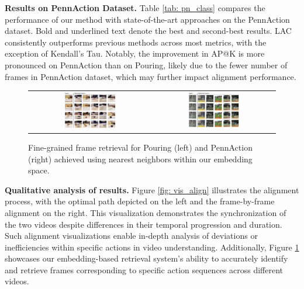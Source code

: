 \noindent \textbf{Results on PennAction Dataset.} 
Table \ref{tab: pn_class} compares the performance of our method with state-of-the-art approaches on the PennAction dataset. Bold and underlined text denote the best and second-best results. 
LAC consistently outperforms previous methods across most metrics, with the exception of Kendall's Tau. 
Notably, the improvement in AP@K is more pronounced on PennAction than on Pouring, likely due to the fewer number of frames in PennAction dataset, which may further impact alignment performance.

\begin{figure}[t]
\begin{tabular}{cc}
\includegraphics[width=0.45\textwidth]{images/v3.png}&\includegraphics[width=0.45\textwidth]{images/v4.png}
\end{tabular}
\caption{Fine-grained frame retrieval for Pouring (left) and PennAction (right) achieved using nearest neighbors within our embedding space.}
\label{fig: vis_retr}
\end{figure}

\noindent \textbf{Qualitative analysis of results.} 
Figure \ref{fig: vis_align} illustrates the alignment process, with the optimal path depicted on the left and the frame-by-frame alignment on the right. 
This visualization demonstrates the synchronization of the two videos despite differences in their temporal progression and duration. 
Such alignment visualizations enable in-depth analysis of deviations or inefficiencies within specific actions in video understanding.
Additionally, Figure \ref{fig: vis_retr} showcases our embedding-based retrieval system's ability to accurately identify and retrieve frames corresponding to specific action sequences across different videos.

